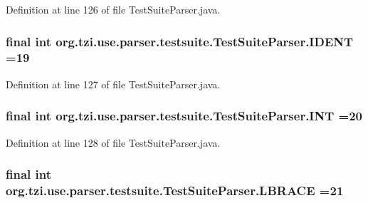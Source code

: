 Definition at line 126 of file Test\-Suite\-Parser.\-java.

\hypertarget{classorg_1_1tzi_1_1use_1_1parser_1_1testsuite_1_1_test_suite_parser_aae4c03faf701e886069fb151f7fdc057}{
\subsubsection[{I\-D\-E\-N\-T}]{\setlength{\rightskip}{0pt plus 5cm}final int org.\-tzi.\-use.\-parser.\-testsuite.\-Test\-Suite\-Parser.\-I\-D\-E\-N\-T =19\hspace{0.3cm}{\ttfamily [static]}}}\label{classorg_1_1tzi_1_1use_1_1parser_1_1testsuite_1_1_test_suite_parser_aae4c03faf701e886069fb151f7fdc057}


Definition at line 127 of file Test\-Suite\-Parser.\-java.

\hypertarget{classorg_1_1tzi_1_1use_1_1parser_1_1testsuite_1_1_test_suite_parser_a03a3586f9e16f8f6f4afe075d05a28ea}{
\subsubsection[{I\-N\-T}]{\setlength{\rightskip}{0pt plus 5cm}final int org.\-tzi.\-use.\-parser.\-testsuite.\-Test\-Suite\-Parser.\-I\-N\-T =20\hspace{0.3cm}{\ttfamily [static]}}}\label{classorg_1_1tzi_1_1use_1_1parser_1_1testsuite_1_1_test_suite_parser_a03a3586f9e16f8f6f4afe075d05a28ea}


Definition at line 128 of file Test\-Suite\-Parser.\-java.

\hypertarget{classorg_1_1tzi_1_1use_1_1parser_1_1testsuite_1_1_test_suite_parser_aaf0ae0ba43c947ed59cbc44b660988e2}{
\subsubsection[{L\-B\-R\-A\-C\-E}]{\setlength{\rightskip}{0pt plus 5cm}final int org.\-tzi.\-use.\-parser.\-testsuite.\-Test\-Suite\-Parser.\-L\-B\-R\-A\-C\-E =21\hspace{0.3cm}{\ttfamily [static]}}}\label{classorg_1_1tzi_1_1use_1_1parser_1_1testsuite_1_1_test_suite_parser_aaf0ae0ba43c947ed59cbc44b660988e2}


